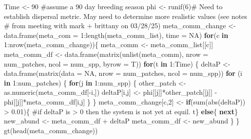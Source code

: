 \documentclass[
  letterpaper,
  DIV=11,
  numbers=noendperiod]{scrartcl}
\newenvironment{Shaded}{\begin{snugshade}}{\end{snugshade}}
\newcommand{\AttributeTok}[1]{\textcolor[rgb]{0.40,0.45,0.13}{#1}}
\newcommand{\CommentTok}[1]{\textcolor[rgb]{0.37,0.37,0.37}{#1}}
\newcommand{\ConstantTok}[1]{\textcolor[rgb]{0.56,0.35,0.01}{#1}}
\newcommand{\ControlFlowTok}[1]{\textcolor[rgb]{0.00,0.23,0.31}{\textbf{#1}}}
\newcommand{\DecValTok}[1]{\textcolor[rgb]{0.68,0.00,0.00}{#1}}
\newcommand{\FloatTok}[1]{\textcolor[rgb]{0.68,0.00,0.00}{#1}}
\newcommand{\FunctionTok}[1]{\textcolor[rgb]{0.28,0.35,0.67}{#1}}
\newcommand{\NormalTok}[1]{\textcolor[rgb]{0.00,0.23,0.31}{#1}}
\newcommand{\OtherTok}[1]{\textcolor[rgb]{0.00,0.23,0.31}{#1}}
\newcommand{\SpecialCharTok}[1]{\textcolor[rgb]{0.37,0.37,0.37}{#1}}
\begin{document}
\begin{Shaded}
\begin{Highlighting}[]
\NormalTok{Time }\OtherTok{\textless{}{-}} \DecValTok{90} \CommentTok{\#assume a 90 day breeding season}
\NormalTok{phi }\OtherTok{\textless{}{-}} \FunctionTok{runif}\NormalTok{(}\DecValTok{6}\NormalTok{)}\CommentTok{\# Need to establish dispersal metric. May need to determine more realistic values (see notes}
\CommentTok{\# from meeting with mark + brittany on 03/28/25)}
\NormalTok{meta\_comm\_change }\OtherTok{\textless{}{-}} \FunctionTok{data.frame}\NormalTok{(}\AttributeTok{meta\_com =} \DecValTok{1}\SpecialCharTok{:}\FunctionTok{length}\NormalTok{(meta\_comm\_list), }\AttributeTok{time =} \ConstantTok{NA}\NormalTok{)}
\ControlFlowTok{for}\NormalTok{(c }\ControlFlowTok{in} \DecValTok{1}\SpecialCharTok{:}\FunctionTok{nrow}\NormalTok{(meta\_comm\_change))\{}
\NormalTok{  meta\_comm }\OtherTok{\textless{}{-}}\NormalTok{ meta\_comm\_list[[c]]}
\NormalTok{  meta\_comm\_df }\OtherTok{\textless{}{-}} \FunctionTok{data.frame}\NormalTok{(}\FunctionTok{matrix}\NormalTok{(}\FunctionTok{unlist}\NormalTok{(meta\_comm), }\AttributeTok{nrow =}\NormalTok{ num\_patches, }\AttributeTok{ncol =}\NormalTok{ num\_spp, }\AttributeTok{byrow =}\NormalTok{ T))}
  \ControlFlowTok{for}\NormalTok{(t }\ControlFlowTok{in} \DecValTok{1}\SpecialCharTok{:}\NormalTok{Time) \{}
\NormalTok{    deltaP }\OtherTok{\textless{}{-}} \FunctionTok{data.frame}\NormalTok{(}\FunctionTok{matrix}\NormalTok{(}\AttributeTok{data =} \ConstantTok{NA}\NormalTok{, }\AttributeTok{nrow =}\NormalTok{ num\_patches, }\AttributeTok{ncol =}\NormalTok{ num\_spp))}
    \ControlFlowTok{for}\NormalTok{ (i }\ControlFlowTok{in} \DecValTok{1}\SpecialCharTok{:}\NormalTok{num\_patches) \{}
      \ControlFlowTok{for}\NormalTok{(j }\ControlFlowTok{in} \DecValTok{1}\SpecialCharTok{:}\NormalTok{num\_spp) \{}
\NormalTok{        other\_patch }\OtherTok{\textless{}{-}} \FunctionTok{as.numeric}\NormalTok{(meta\_comm\_df[}\SpecialCharTok{{-}}\NormalTok{i,])}
\NormalTok{        deltaP[i,j] }\OtherTok{\textless{}{-}}\NormalTok{ phi[[j]]}\SpecialCharTok{*}\NormalTok{other\_patch[[j]] }\SpecialCharTok{{-}}\NormalTok{ phi[[j]]}\SpecialCharTok{*}\NormalTok{meta\_comm\_df[i,j]}
\NormalTok{      \}}
\NormalTok{    \}}
\NormalTok{    meta\_comm\_change[c,}\DecValTok{2}\NormalTok{] }\OtherTok{\textless{}{-}} \ControlFlowTok{if}\NormalTok{(}\FunctionTok{sum}\NormalTok{(}\FunctionTok{abs}\NormalTok{(deltaP)) }\SpecialCharTok{\textgreater{}} \FloatTok{0.01}\NormalTok{)\{ }
      \CommentTok{\#if deltaP is \textgreater{} 0 then the system is not yet at equil.}
\NormalTok{      t\} }\ControlFlowTok{else}\NormalTok{\{}
        \ControlFlowTok{next}\NormalTok{\}}
\NormalTok{    new\_abund }\OtherTok{\textless{}{-}}\NormalTok{ meta\_comm\_df }\SpecialCharTok{+}\NormalTok{ deltaP}
\NormalTok{    meta\_comm\_df }\OtherTok{\textless{}{-}}\NormalTok{ new\_abund}
\NormalTok{  \}}
\NormalTok{\}}
\FunctionTok{gt}\NormalTok{(}\FunctionTok{head}\NormalTok{(meta\_comm\_change))}
\end{Highlighting}
\end{Shaded}
\end{document}
